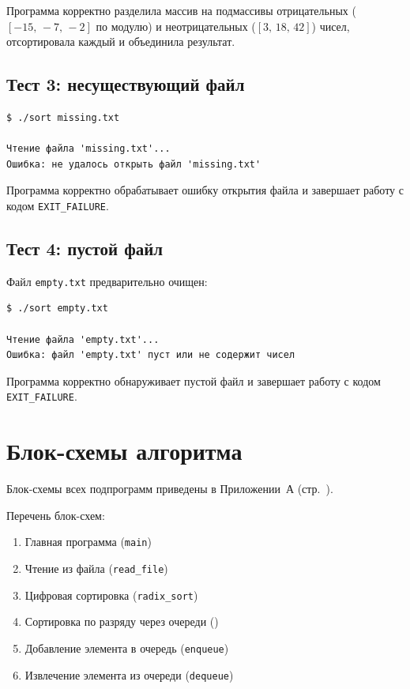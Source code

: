 \documentclass[a4paper,14pt]{extarticle}
\newcommand{\tcode}[1]{\code{#1}}
\begin{document}
Программа корректно разделила массив на подмассивы отрицательных ($[-15,\,-7,\,-2]$ по модулю) и неотрицательных ($[3,\,18,\,42]$) чисел, отсортировала каждый и объединила результат.

\subsection{Тест 3: несуществующий файл}

\begin{Verbatim}[frame=single,fontsize=\footnotesize]
$ ./sort missing.txt

Чтение файла 'missing.txt'...
Ошибка: не удалось открыть файл 'missing.txt'
\end{Verbatim}

Программа корректно обрабатывает ошибку открытия файла и завершает работу с кодом \texttt{EXIT\_FAILURE}.

\subsection{Тест 4: пустой файл}

Файл \texttt{empty.txt} предварительно очищен:

\begin{Verbatim}[frame=single,fontsize=\footnotesize]
$ ./sort empty.txt

Чтение файла 'empty.txt'...
Ошибка: файл 'empty.txt' пуст или не содержит чисел
\end{Verbatim}

Программа корректно обнаруживает пустой файл и завершает работу с кодом \texttt{EXIT\_FAILURE}.

\newpage
\section{Блок-схемы алгоритма}

Блок-схемы всех подпрограмм приведены в Приложении~А (стр.~\pageref{sec:appendix}).

Перечень блок-схем:
\begin{enumerate}
  \item Главная программа (\texttt{main})
  \item Чтение из файла (\texttt{read\_file})
  \item Цифровая сортировка (\texttt{radix\_sort})
  \item Сортировка по разряду через очереди (\tcode{counting_sort_by_queue})
  \item Добавление элемента в очередь (\texttt{enqueue})
  \item Извлечение элемента из очереди (\texttt{dequeue})
\end{enumerate}
\end{document}
